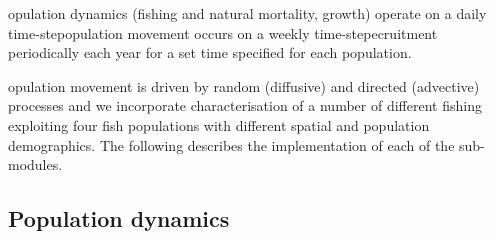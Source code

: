 \documentclass[review]{elsarticle}
\begin{document}
opulation dynamics (fishing and natural mortality,
growth) operate on a daily time-stepopulation
movement occurs on a weekly time-stepecruitment
 periodically each year for a set time
 specified for each
population.  

opulation movement is driven by
random (diffusive) and directed (advective) processes and we incorporate
characterisation of a number of different fishing 
exploiting four fish populations with different spatial and population
demographics. The following describes the implementation of each of the
sub-modules.

\subsection{Population dynamics}
\end{document}

